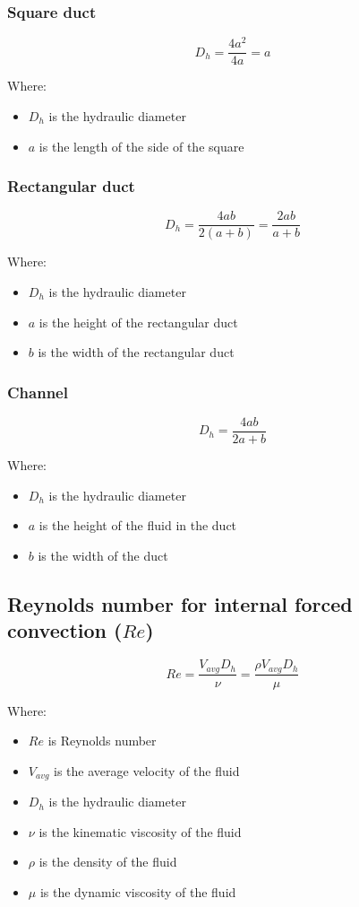 \documentclass[11pt]{article}
\begin{document}
\subsubsection{Square duct}
\label{sec:orgb5f69e6}
\[D_h = \frac{4a^2}{4a} = a\]

Where:
\begin{itemize}
\item \(D_h\) is the hydraulic diameter
\item \(a\) is the length of the side of the square
\end{itemize}

\subsubsection{Rectangular duct}
\label{sec:org816dd98}
\[D_h = \frac{4ab}{2(a + b)} = \frac{2ab}{a + b}\]

Where:
\begin{itemize}
\item \(D_h\) is the hydraulic diameter
\item \(a\) is the height of the rectangular duct
\item \(b\) is the width of the rectangular duct
\end{itemize}

\subsubsection{Channel}
\label{sec:org2fc7bd3}
\[D_h = \frac{4ab}{2a + b}\]

Where:
\begin{itemize}
\item \(D_h\) is the hydraulic diameter
\item \(a\) is the height of the fluid in the duct
\item \(b\) is the width of the duct
\end{itemize}

 \newpage

\subsection{Reynolds number for internal forced convection (\(Re\))}
\label{sec:org79c3999}
\[Re = \frac{V_{avg} D_h}{\nu} = \frac{\rho V_{avg} D_h}{\mu}\]

Where:
\begin{itemize}
\item \(Re\) is Reynolds number
\item \(V_{avg}\) is the average velocity of the fluid
\item \(D_h\) is the hydraulic diameter
\item \(\nu\) is the kinematic viscosity of the fluid
\item \(\rho\) is the density of the fluid
\item \(\mu\) is the dynamic viscosity of the fluid
\end{itemize}
\end{document}

